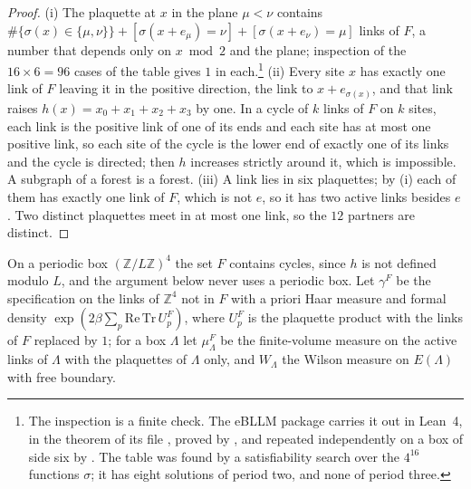 \begin{proof}
(i) The plaquette at $x$ in the plane $\mu<\nu$ contains $\#\{\sigma(x)\in\{\mu,\nu\}\}+[\sigma(x+e_{\mu})=\nu]+[\sigma(x+e_{\nu})=\mu]$ links of $F$, a number that depends only on $x\bmod2$ and the plane; inspection of the $16\times6=96$ cases of the table gives $1$ in each.\footnote{The inspection is a finite check. The eBLLM package carries it out in Lean~4, in the theorem  of its file , proved by , and repeated independently on a box of side six by . The table was found by a satisfiability search over the $4^{16}$ functions $\sigma$; it has eight solutions of period two, and none of period three.} (ii) Every site $x$ has exactly one link of $F$ leaving it in the positive direction, the link to $x+e_{\sigma(x)}$, and that link raises $h(x)=x_{0}+x_{1}+x_{2}+x_{3}$ by one. In a cycle of $k$ links of $F$ on $k$ sites, each link is the positive link of one of its ends and each site has at most one positive link, so each site of the cycle is the lower end of exactly one of its links and the cycle is directed; then $h$ increases strictly around it, which is impossible. A subgraph of a forest is a forest. (iii) A link lies in six plaquettes; by (i) each of them has exactly one link of $F$, which is not $e$, so it has two active links besides $e$. Two distinct plaquettes meet in at most one link, so the $12$ partners are distinct.
\end{proof}

On a periodic box $(\mathbb{Z}/L\mathbb{Z})^{4}$ the set $F$ contains cycles, since $h$ is not defined modulo $L$, and the argument below never uses a periodic box. Let $\gamma^{F}$ be the specification on the links of $\mathbb{Z}^{4}$ not in $F$ with a priori Haar measure and formal density $\exp(2\beta\sum_{p}\mathrm{Re}\,\mathrm{Tr}\,U^{F}_{p})$, where $U^{F}_{p}$ is the plaquette product with the links of $F$ replaced by $1$; for a box $\Lambda$ let $\mu^{F}_{\Lambda}$ be the finite-volume measure on the active links of $\Lambda$ with the plaquettes of $\Lambda$ only, and $W_{\Lambda}$ the Wilson measure on $E(\Lambda)$ with free boundary.

